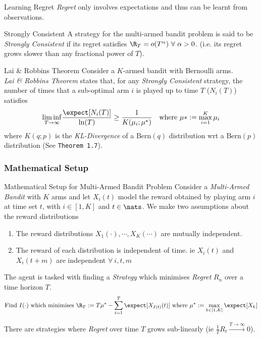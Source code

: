 \documentclass[11pt,a4paper]{article}
\begin{document}
  \begin{remark}{Learning Regret}
      \textit{Regret} only involves expectations and thus can be learnt from observations.
  \end{remark}

  \begin{definition}{Strongly Consistent}
    A strategy for the multi-armed bandit problem is said to be \textit{Strongly Consistent} if its regret satisfies $\R_T=o(T^\alpha)\ \forall\ \alpha>0$. (i.e. its regret grows slower than any fractional power of $T$).
  \end{definition}

  \begin{theorem}{Lai \& Robbins Theorem}
    Consider a $K$-armed bandit with Bernoulli arms.\\
    \textit{Lai \& Robbins Theorem} states that, for any \textit{Strongly Consistent} strategy, the number of times that a sub-optimal arm $i$ is played up to time $T$ ($N_i(T)$) satisfies
    \[ \underset{T\to\infty}{\lim\inf}\frac{\expect[N_i(T)]}{\ln(T)}\geq\frac1{K(\mu_i;\mu^*)}\quad\text{where }\mu*:=\max_{i=1}^K\mu_i \]
    where $K(q;p)$ is the \textit{KL-Divergence} of a $\text{Bern}(q)$ distribution wrt a $\text{Bern}(p)$ distribution (See \texttt{Theorem 1.7}).
  \end{theorem}

  \subsubsection*{Mathematical Setup}

  \begin{proposition}{Mathematical Setup for Multi-Armed Bandit Problem}
    Consider a \textit{Multi-Armed Bandit} with $K$ arms and let $X_i(t)$ model the reward obtained by playing arm $i$ at time set $t$, with $i\in[1,K]$ and $t\in\nats$. We make two assumptions about the reward distributions
    \begin{enumerate}
      \item The reward distributions $X_1(\cdot),\cdots,X_K(\cdots)$ are mutually independent.
      \item The reward of each distribution is independent of time. ie $X_i(t)$ and $X_i(t+m)$ are independent $\forall\ i,t,m$
    \end{enumerate}
    The agent is tasked with finding a \textit{Strategy} which minimises \textit{Regret} $R_n$ over a time horizon $T$.
    \[ \text{Find }I(\cdot)\text{ which minimises }\R_T:=T\mu^*-\sum_{t=1}^T\expect[X_{I(t)}(t)]\text{ where }\mu^*:=\max_{k\in[1,K]}\expect[X_k] \]
    \par There are strategies where \textit{Regret} over time $T$ grows sub-linearly (ie $\frac1TR_t\overset{T\to\infty}\longrightarrow0$).
  \end{proposition}
\end{document}
